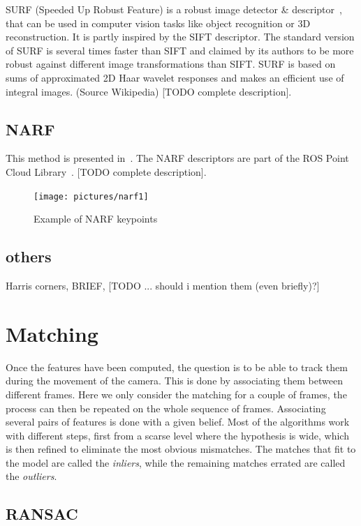 SURF (Speeded Up Robust Feature) is a robust image detector \& descriptor~\cite{surf}, that can be used in computer vision tasks like object recognition or 3D reconstruction. It is partly inspired by the SIFT descriptor. The standard version of SURF is several times faster than SIFT and claimed by its authors to be more robust against different image transformations than SIFT. SURF is based on sums of approximated 2D Haar wavelet responses and makes an efficient use of integral images. (Source Wikipedia) [TODO complete description].

\subsection{NARF}

This method is presented in~\cite{steder10irosws}. The NARF descriptors are part of the ROS Point Cloud Library~\cite{Rusu_ICRA2011_PCL}. [TODO complete description].

\begin{figure}[h!]
\centering
\texttt{[image: pictures/narf1]}
\caption{Example of NARF keypoints}
\end{figure}

\subsection{others}

Harris corners, BRIEF, [TODO ... should i mention them (even briefly)?]


\section{Matching}

Once the features have been computed, the question is to be able to track them during the movement of the camera. This is done by associating them between different frames. Here we only consider the matching for a couple of frames, the process can then be repeated on the whole sequence of frames. Associating several pairs of features is done with a given belief. Most of the algorithms work with different steps, first from a scarse level where the hypothesis is wide, which is then refined to eliminate the most obvious mismatches. The matches that fit to the model are called the \emph{inliers}, while the remaining matches errated are called the \emph{outliers}.

\subsection{RANSAC}
\label{sub:ransac}

